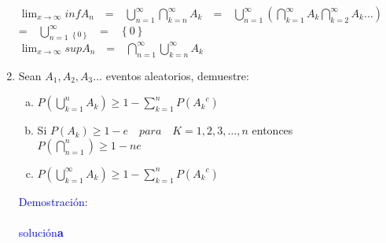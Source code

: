 \documentclass[a4paper, 12pt]{article}
\begin{document}
\begin{enumerate}
$\displaystyle\lim_{x \rightarrow \infty}inf A_n\quad$=$\quad\displaystyle\bigcup_{n=1}^{\infty}\bigcap_{k=n}^{\infty}{A_k}\quad$=$\quad\displaystyle\bigcup_{n=1}^{\infty}\left(\bigcap_{k=1}^{\infty}{A_k}\bigcap_{k=2}^{\infty}{A_k}\ldots\right)\quad$=$\quad\displaystyle\bigcup_{n=1}^{\infty}_\left\lbrace 0\right\rbrace\quad$=$\quad\left\lbrace 0\right\rbrace$\\
$\displaystyle\lim_{x \rightarrow \infty}sup A_n\quad$=$\quad\displaystyle\bigcap_{n=1}^{\infty}\bigcup_{k=n}^{\infty}{A_k}$
\item Sean $A_1,A_2,A_3 \ldots$ eventos aleatorios, demuestre:\\
\begin{enumerate}[a.]
\item $P\left(\displaystyle\bigcup_{k=1}^{n}{A_k}\right)\geq 1- \displaystyle\sum_{k=1}^n P\left({A_k}^c \right)$
\item Si $P\left(A_k\right)\geq 1 - e \quad para \quad K= 1,2,3, \ldots,n$ entonces $P\left(\bigcap_{n=1}^{n} \right)\geq 1 - ne$
\item $P\left(\displaystyle\bigcup_{k=1}^{\infty}{A_k}\right)\geq 1 -   \displaystyle\sum_{k=1}^n P\left({A_k}^c \right)$
\end{enumerate}
\textcolor{blue}{ Demostraci\'on}:\\\\
\textcolor{blue}{ soluci\'on\quad\textbf{a}}\\\\


\end{enumerate}
\end{document}
